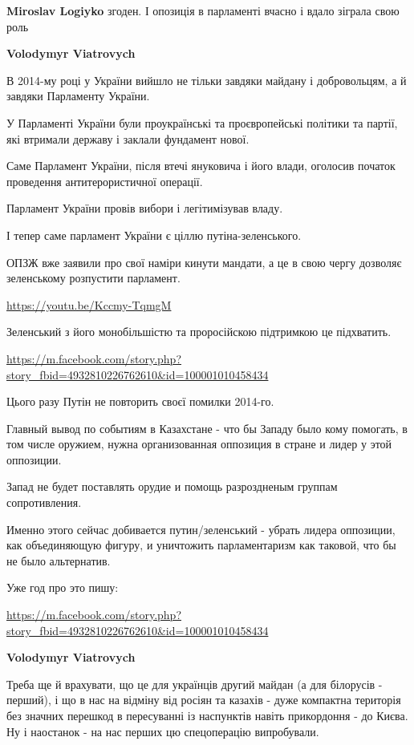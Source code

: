 \begin{itemize}
\begin{itemize}
\begin{itemize} %
\textbf{Miroslav Logiyko} згоден. І опозиція в парламенті вчасно і вдало зіграла свою роль

\textbf{Volodymyr Viatrovych} 

В 2014-му році у України вийшло не тільки завдяки майдану і добровольцям, а й
завдяки Парламенту України.

У Парламенті України були проукраїнські та проєвропейські політики та партії,
які втримали державу і заклали фундамент нової.

Саме Парламент України, після втечі януковича і його влади, оголосив початок
проведення антитерористичної операції.

Парламент України провів вибори і легітимізував владу.

І тепер саме парламент України є ціллю путіна-зеленського.

ОПЗЖ вже заявили про свої наміри кинути мандати, а це в свою чергу дозволяє
зеленському розпустити парламент.

\url{https://youtu.be/Kccmy-TqmgM}

Зеленський з його монобільшістю та проросійскою підтримкою це підхватить.

\url{https://m.facebook.com/story.php?story_fbid=4932810226762610&id=100001010458434}

Цього разу Путін не повторить своєї помилки 2014-го.

Главный вывод по событиям в Казахстане - что бы Западу было кому помогать, в
том числе оружием, нужна организованная оппозиция в стране и лидер у этой
оппозиции.

Запад не будет поставлять орудие и помощь разроздненым группам сопротивления.

Именно этого сейчас добивается путин/зеленський - убрать лидера оппозиции, как
объединяющую фигуру, и уничтожить парламентаризм как таковой, что бы не было
альтернатив.

Уже год про это пишу:

\url{https://m.facebook.com/story.php?story_fbid=4932810226762610&id=100001010458434}
\end{itemize} %

\textbf{Volodymyr Viatrovych} 

Треба ще й врахувати, що це для українців другий майдан (а для білорусів -
перший), і що в нас на відміну від росіян та казахів - дуже компактна територія
без значних перешкод в пересуванні із наспунктів навіть прикордоння - до Києва.
Ну і наостанок - на нас перших цю спецоперацію випробували.


\end{itemize}
\end{itemize}
